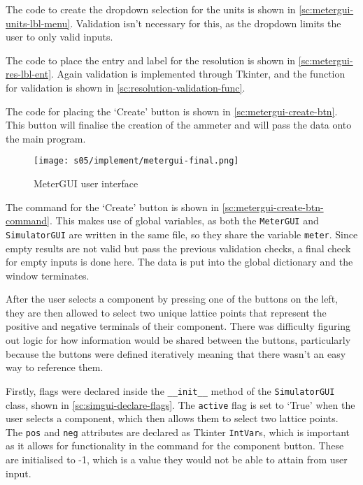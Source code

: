     The code to create the dropdown selection for the units is shown in \autoref{sc:metergui-units-lbl-menu}. 
    Validation isn't necessary for this, as the dropdown limits the user to only valid inputs. 

    The code to place the entry and label for the resolution is shown in \autoref{sc:metergui-res-lbl-ent}.
    Again validation is implemented through Tkinter, and the function for validation is shown in \autoref{sc:resolution-validation-func}. 

    The code for placing the `Create' button is shown in \autoref{sc:metergui-create-btn}. 
    This button will finalise the creation of the ammeter and will pass the data onto the main program. 

    \begin{figure}[!ht]
        \centering
        \texttt{[image: s05/implement/metergui-final.png]}
        \caption{MeterGUI user interface}
        \label{fig:metergui-final}
    \end{figure}

    The command for the `Create' button is shown in \autoref{sc:metergui-create-btn-command}. 
    This makes use of global variables, as both the \verb|MeterGUI| and \verb|SimulatorGUI| are written in the same file, so they share the variable \verb|meter|. 
    Since empty results are not valid but pass the previous validation checks, a final check for empty inputs is done here. 
    The data is put into the global dictionary and the window terminates. 

    

    After the user selects a component by pressing one of the buttons on the left, they are then allowed to select two unique lattice points that represent the positive and negative terminals of their component. 
    There was difficulty figuring out logic for how information would be shared between the buttons, particularly because the buttons were defined iteratively meaning that there wasn't an easy way to reference them. 

    Firstly, flags were declared inside the \verb|__init__| method of the \verb|SimulatorGUI| class, shown in \autoref{sc:simgui-declare-flags}. 
    The \verb|active| flag is set to `True' when the user selects a component, which then allows them to select two lattice points. 
    The \verb|pos| and \verb|neg| attributes are declared as Tkinter \verb|IntVar|s, which is important as it allows for functionality in the command for the component button. 
    These are initialised to -1, which is a value they would not be able to attain from user input. 
    
